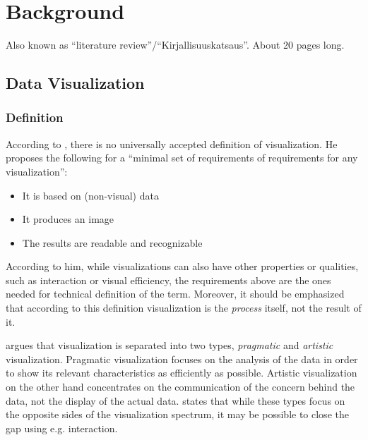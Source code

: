 
\chapter{Background}
\label{chapter:background} 

Also known as ``literature review''/``Kirjallisuuskatsaus''. About 20 pages long.


\section{Data Visualization}

\subsection{Definition}

According to \citet[chap.~3]{kosara_visualization_2007}, there is no universally accepted definition of visualization. He proposes the following for a ``minimal set of requirements of requirements for any visualization'':

\begin{itemize}
	\item It is based on (non-visual) data
	\item It produces an image
	\item The results are readable and recognizable
\end{itemize}

According to him, while visualizations can also have other properties or qualities, such as interaction or visual efficiency, the requirements above are the ones needed for technical definition of the term. Moreover, it should be emphasized that according to this definition visualization is the \emph{process} itself, not the result of it.

\citet[chap.~4]{kosara_visualization_2007} argues that visualization is separated into two types, \emph{pragmatic} and \emph{artistic} visualization. Pragmatic visualization focuses on the analysis of the data in order to show its relevant characteristics as efficiently as possible. Artistic visualization on the other hand concentrates on the communication of the concern behind the data, not the display of the actual data. \citeauthor{kosara_visualization_2007} states that while these types focus on the opposite sides of the visualization spectrum, it may be possible to close the gap using e.g. interaction.

